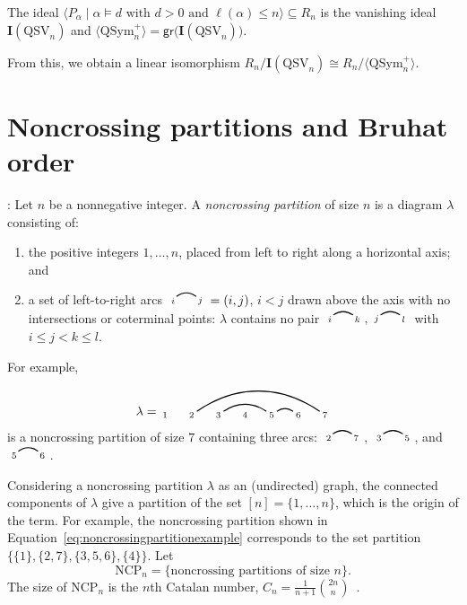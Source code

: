 \documentclass[submission]{FPSAC2024}
\theoremstyle{definition}
\theoremstyle{remark}
\numberwithin{equation}{section}
\newenvironment{introthm}[1]{
  \renewcommand\theequation{#1}
  \thm
}{\endthm}
\newcommand{\QSym}{\mathrm{QSym}}
\newcommand{\QSV}{\mathrm{QSV}}
\newcommand{\NCP}{\mathrm{NCP}}
\newcommand{\edge}[2]{\tikz[scale = 0.75, baseline = -0.2cm]{
\draw (0.1, 0) node[inner sep = 0ex] (a) {};
\node[left, xshift = 0.1cm, yshift = -0.1cm] at (a) {$\scriptstyle #1$};
\draw (0.9, 0)  node[inner sep = 0ex] (b) {};
\node[right, xshift = -0.1cm, yshift = -0.1cm] at (b) {$\scriptstyle #2$};
\draw[thick] (a) to[out = 35, in = 145] (b);}}
\begin{document}
\begin{introthm}{\ref{thm:vanishingQSV}}
The ideal $\langle P_{\alpha} \;|\; \text{$\alpha \vDash d $ with $d> 0$ and $\ell(\alpha) \le n$} \rangle \subseteq R_n$ is the vanishing ideal $\mathbf{I}(\QSV_n)$ and 
$ \langle \QSym_{n}^{+} \rangle = \mathsf{gr}\big(\mathbf{I}(\QSV_{n})\big).$
\end{introthm}

From this, we obtain a linear isomorphism
$R_{n}\big/\mathbf{I}(\QSV_{n}) \cong R_{n}\big/\langle \QSym_{n}^{+} \rangle.$

\section{Noncrossing partitions and Bruhat order}
\label{sec:ncp}


\medskip{}:
Let $n$ be a nonnegative integer.  A \emph{noncrossing partition} of size $n$ is a diagram $\lambda$ consisting of:
\begin{enumerate}[itemsep = -.5ex]
\item the positive integers $1, \ldots, n$, placed from left to right along a horizontal axis; and

\item a set of left-to-right arcs $\edge{i}{j} = (i, j)$, $i < j$ drawn above the axis with no intersections or coterminal points: $\lambda$ contains no pair $\edge{i}{k}, \edge{j}{l}$ with $i \le j < k \le l$.

\end{enumerate}
For example,
\begin{equation}
\label{eq:noncrossingpartitionexample}
\lambda = \begin{tikzpicture}[scale = 0.75, baseline = 0.75*-0.2]
\foreach \x in {1, ..., 7}{\draw[fill] (\x - 1, 0) node[inner sep = 2pt] (\x) {$\scriptstyle \x$};}
\foreach \i\j in {5/6, 3/5,2/7}{\draw[thick] (\i) to[out = 35, in = 145] (\j);}
\end{tikzpicture}
\end{equation}
is a noncrossing partition of size $7$ containing three arcs: $\edge{2}{7}$, $\edge{3}{5}$, and $\edge{5}{6}$.

Considering a noncrossing partition $\lambda$ as an (undirected) graph, the connected components of $\lambda$ give a partition of the set $[n] = \{1, \ldots, n\}$, which is the origin of the term.  For example, the noncrossing partition shown in Equation~\eqref{eq:noncrossingpartitionexample} corresponds to the set partition $\big\{ \{1\}, \{2, 7\}, \{3, 5, 6\}, \{4\}  \big\}$.  Let
\[
\NCP_{n} = \{ \text{noncrossing partitions of size $n$} \}.
\]
The size of $\NCP_{n}$ is the $n$th Catalan number, $C_{n} = \frac{1}{n+1}\binom{2n}{n}$~\cite{S99}.
\end{document}
